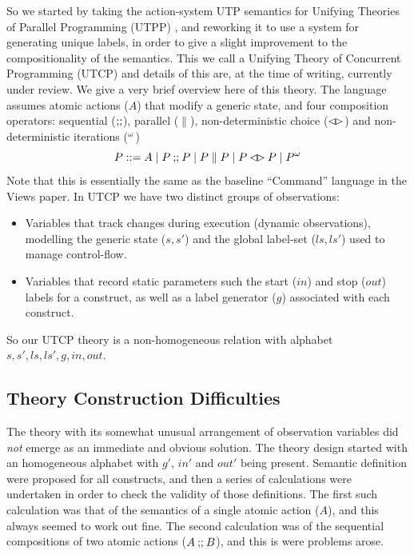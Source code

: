 So we started by taking the action-system UTP semantics for Unifying Theories
of Parallel Programming (UTPP) \cite{DBLP:conf/icfem/WoodcockH02},
and reworking it to use a system for generating unique labels,
in order to give a slight improvement to the compositionality
of the semantics. This we call a Unifying Theory of Concurrent Programming
(UTCP) and details of this are,
at the time of writing,
currently under review\cite{conf/tase/BMN165}.
We give a very brief overview here of this theory.
The language assumes atomic actions ($A$) that modify a generic state,
and four composition operators: sequential ($\mathrel{\mathbf{;\!;}}$), parallel ($\parallel$),
non-deterministic choice ($\mathbin{\lhd\!\rhd}$) and non-deterministic iterations (${}^{\omega}$)
\[
   P ::= A \mid P \mathbin{\mathbf{;\!;}} P \mid P \parallel P \mid P \mathbin{\lhd\!\rhd} P \mid {P}^{\omega}
\]
Note that this is essentially the same as the baseline ``Command'' language
in the Views paper\cite{conf/popl/Dinsdale-YoungBGPY13}.
In UTCP we have two distinct groups of observations:
\begin{itemize}
  \item
    Variables that track changes during execution
    (dynamic observations),
    modelling the generic state ($s,s'$)
    and the global label-set ($ls,ls'$) used to manage control-flow.
  \item
    Variables that record static parameters such the start ($in$)
    and stop ($out$) labels for a construct,
    as well as a label generator ($g$) associated with each construct.
\end{itemize}
So our UTCP theory is a non-homogeneous relation with alphabet $s,s',ls,ls',g,in,out$.


\subsection{Theory Construction Difficulties}\label{ssec:difficulties}

The theory with its somewhat unusual arrangement of observation variables
did \emph{not} emerge as an immediate and obvious solution.
The theory design started with an homogeneous alphabet with $g'$, $in'$ and $out'$
being present. Semantic definition were proposed for all constructs,
and then a series of calculations were undertaken in order to check
the validity of those definitions.
The first such calculation was that of the semantics of a single atomic
action ($A$), and this always seemed to work out fine.
The second calculation was of the sequential compositions of two atomic
actions ($A\mathbin{\mathbf{;\!;}} B$), and this is were problems arose.

